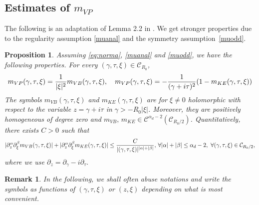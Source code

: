 \documentclass[11pt]{amsart}
\numberwithin{equation}{section}
\newtheorem{prop}{Proposition}[section]
\newtheorem{rem}{Remark}[section]
\begin{document}
 \subsection{Estimates of $m_{VP}$}
The following is an adaptation of Lemma 2.2 in \cite{HNR}. We get stronger properties due to the regularity assumption
 \eqref{muanal} and the symmetry assumption~\eqref{muodd}.
\begin{prop}
  \label{lem-VP-VB}
  Assuming \eqref{eq:norma}, \eqref{muanal} and \eqref{muodd}, we have the following properties.
For every  $(\gamma, \tau, \xi) \in \mathcal{C}_{R_{0}}$,
      \begin{equation}
     \label{eq-K1def} m_{VP}(\gamma, \tau, \xi)=    \frac{1}{|\xi |^2}   m_{VB}(\gamma, \tau, \xi), \quad 
      m_{VP}(\gamma, \tau, \xi)= - { 1 \over (\gamma + i \tau)^2}( 1 - m_{KE}(\gamma, \tau, \xi))
     \end{equation}
The symbols $  m_{VB}(\gamma, \tau, \xi)$  and $m_{KE}(\gamma, \tau, \xi)$ 
 are for $\xi \neq 0$ holomorphic with respect to the variable $z= \gamma + i \tau$ in $\gamma > - R_{0} | \xi|$.
  Moreover, they 
are  positively homogeneous of degree zero and $m_{VB},\, m_{KE} \in \mathscr{C}^{\alpha_d - 2}(\mathcal{C}_{R_{0}/2})$.
 Quantitatively, there exists $C>0$ such that 
   \begin{equation}
   \label{eq-estmVB}
   | \partial_{z}^\alpha \partial_{\xi}^\beta m_{VB}(\gamma, \tau, \xi) | + | \partial_{z}^\alpha \partial_{\xi}^\beta m_{KE}(\gamma, \tau, \xi) |
    \leq {C \over |(\gamma, \tau, \xi)|^{|\alpha| + |\beta|}}, \, \forall | \alpha| + |\beta | \leq   \alpha_d - 2,\,  \, \forall (\gamma, \tau, \xi) \in  \mathcal{C}_{R_{0}/2},
    \end{equation}
where we use $\partial_{z}=  \partial_{\gamma} - i \partial_{\tau}.$
   
  \end{prop}
 
\begin{rem}
In the following, we shall often abuse notations and write the symbols as functions of $(\gamma, \tau,\xi)$ or $(z,\xi)$ depending on what is most convenient.
\end{rem}
\end{document}
